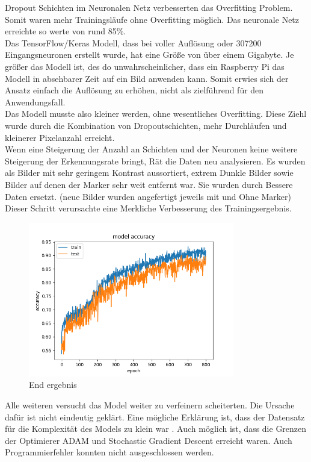 \documentclass[conference]{IEEEtran}
\begin{document}
	Dropout Schichten im Neuronalen Netz verbesserten das Overfitting 
	Problem. Somit waren mehr Trainingsläufe ohne Overfitting möglich. Das 
	neuronale Netz erreichte so werte von rund 85\%. \\
	
	Das TensorFlow/Keras Modell, dass bei voller Auflösung oder 307200 
	Eingangsneuronen erstellt wurde, hat eine Größe von über einem 
	Gigabyte. Je größer das Modell ist, des do unwahrscheinlicher, dass ein 
	Raspberry Pi das Modell in absehbarer Zeit auf ein Bild anwenden kann. 
	Somit erwies sich der Ansatz einfach die Auflösung zu erhöhen,  nicht als 
	zielführend für den Anwendungsfall. \\
	
	Das Modell musste also kleiner werden, ohne wesentliches Overfitting. 
	Diese Ziehl wurde durch die Kombination von Dropoutschichten, mehr 
	Durchläufen und kleinerer Pixelanzahl erreicht. \\
	
	 Wenn eine  Steigerung der Anzahl an Schichten und der Neuronen keine 
	 weitere Steigerung der Erkennungsrate bringt, Rät 
	 \cite{moolayil2019learn} die Daten neu analysieren. Es wurden als 
	 Bilder mit sehr geringem Kontrast aussortiert, extrem Dunkle Bilder 
	 sowie Bilder auf denen der Marker sehr weit entfernt war. Sie wurden 
	 durch Bessere Daten ersetzt. (neue Bilder wurden angefertigt jeweils mit 
	 und Ohne Marker) Dieser Schritt verursachte eine Merkliche 
	 Verbesserung des Trainingsergebnis.
	\\
		
	\begin{figure}[!h]
		\centering
		\includegraphics[width=9cm]{img/213x160:800@32:0_accuracy.png}
		\caption{End ergebnis}
		\label{end Ergenisse }
	\end{figure}
	
	Alle weiteren versucht das Model weiter zu verfeinern scheiterten. Die 
	Ursache dafür ist nicht eindeutig geklärt. Eine mögliche Erklärung ist, 
	dass der Datensatz für die Komplexität des Models zu klein war . Auch 
	möglich ist, dass die Grenzen der Optimierer ADAM und Stochastic 
	Gradient Descent erreicht waren. Auch Programmierfehler konnten nicht 
	ausgeschlossen werden. 
	
\end{document}
